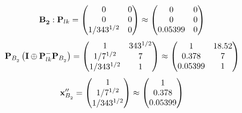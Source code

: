 \documentclass[10pt,a4paper]{article}
\begin{document}
	\[
		\bold{B_2^{}}: \bold{P}_{lk} = 
		\begin{pmatrix}
			{{0}}{} & {{0}}{} \\
			{{0}}{} & {{0}}{} \\
			{1} / {{343^ {1 / 2}}} & {{0}}{} \\
		\end{pmatrix}
		\approx
		\begin{pmatrix}
			0        & 0        \\
			0        & 0        \\
			0.05399  & 0        \\
		\end{pmatrix}
	\]
	\[
		\bold{P}_{B_2^{}}\left(\bold{I} \oplus \bold{P}_{lk}^{-}\bold{P}_{B_2^{}}\right) = 
		\begin{pmatrix}
			{1}{} & {{343^ {1 / 2}}}{} \\
			{1} / {{7^ {1 / 2}}} & {{7}}{} \\
			{1} / {{343^ {1 / 2}}} & {1}{} \\
		\end{pmatrix}
		\approx
		\begin{pmatrix}
			1        & 18.52    \\
			0.378    & 7        \\
			0.05399  & 1        \\
		\end{pmatrix}
	\]
	\[
		\bold{x}''_{B_2^{}} = 
		\begin{pmatrix}
			{1}{} \\
			{1} / {{7^ {1 / 2}}} \\
			{1} / {{343^ {1 / 2}}} \\
		\end{pmatrix}
		\approx
		\begin{pmatrix}
			1        \\
			0.378    \\
			0.05399  \\
		\end{pmatrix}
	\]

\end{document}
